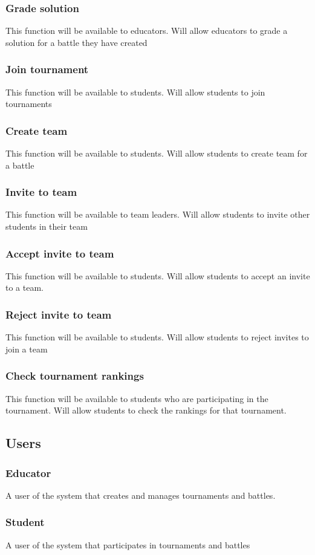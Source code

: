 \documentclass{article}
\begin{document}
\subsubsection{Grade solution}
This function will be available to educators.
Will allow educators to grade a solution for a battle they have created
\subsubsection{Join tournament}
This function will be available to students.
Will allow students to join tournaments
\subsubsection{Create team}
This function will be available to students.
Will allow students to create team for a battle
\subsubsection{Invite to team}
This function will be available to team leaders.
Will allow students to invite other students in their team
\subsubsection{Accept invite to team}
This function will be available to students.
Will allow students to accept an invite to a team.
\subsubsection{Reject invite to team}
This function will be available to students.
Will allow students to reject invites to join a team
\subsubsection{Check tournament rankings}
This function will be available to students who are participating in the tournament.
Will allow students to check the rankings for that tournament.

\subsection{Users}
\subsubsection{Educator}
A user of the system that creates and manages tournaments and battles.
\subsubsection{Student}
A user of the system that participates in tournaments and battles
\end{document}
